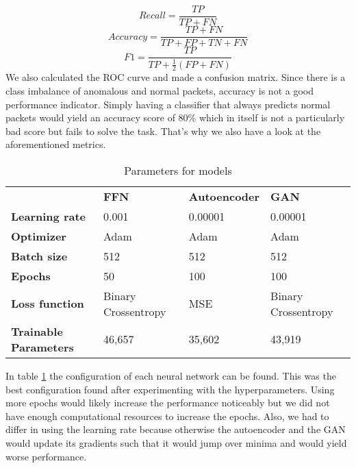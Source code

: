 \documentclass[]{article}
\begin{document}
	\begin{equation}
		Recall = \frac{TP}{TP + FN}
	\end{equation}
	\begin{equation}
		Accuracy = \frac{TP + FN}{TP+FP+TN+FN}
	\end{equation}
\begin{equation}
	F1 = \frac{TP}{TP + \frac{1}{2} (FP+FN)}
\end{equation}
	We also calculated the ROC curve and made a confusion matrix. Since there is a class imbalance of anomalous and normal packets, accuracy is not a good performance indicator. Simply having a classifier that always predicts normal packets would yield an accuracy score of 80\% which in itself is not a particularly bad score but fails to solve the task. That's why we also have a look at the aforementioned metrics. 
	\newline
	
	\begin{table}[]
		\begin{tabular}{llll}
			& \textbf{FFN}        & \textbf{Autoencoder} & \textbf{GAN}        \\
			\textbf{Learning rate} & 0.001               & 0.00001             & 0.00001             \\
			\textbf{Optimizer}     & Adam                & Adam                 & Adam                \\
			\textbf{Batch size}    & 512                 & 512                  & 512                 \\
			\textbf{Epochs}        & 50                  & 100                   & 100                  \\
			\textbf{Loss function} & Binary Crossentropy & MSE  & Binary Crossentropy \\
			\textbf{Trainable Parameters} & 46,657 &  35,602 & 43,919 \\
		\end{tabular}
		\caption{Parameters for models}
		\label{para}
	\end{table}

	\noindent
	In table \ref{para} the configuration of each neural network can be found. This was the best configuration found after experimenting with the hyperparameters. Using more epochs would likely increase the performance noticeably but we did not have enough computational resources to increase the epochs. Also, we had to differ in using the learning rate because otherwise the autoencoder and the GAN would update its gradients such that it would jump over minima and would yield worse performance. 
	
\end{document}
